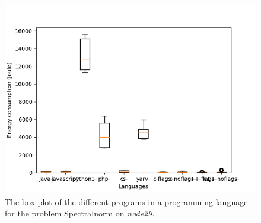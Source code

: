 \begin{appendices}
\begin{table}[h]
\centering
{}
\caption{The comparison of the different languages for the Revcomp problem on \textit{node29}. A \textit{+} means that the language on the row has a lower energy consumption then the language on the column, the opposite for \textit{-}, and the \textit{Unknown} means that we could not reject the null hypothesis.}
\label{tab:lang-revcomp2}
\end{table}

\begin{figure}[h]
    \centering
    \includegraphics[width=.6\textwidth]{graphs/spectralnorm_BOXoverview2.png}
    \caption{The box plot of the different programs in a programming language for the problem Spectralnorm on \textit{node29}.}
    \label{fig:box-spectralnorm2}
\end{figure}


\end{appendices}
